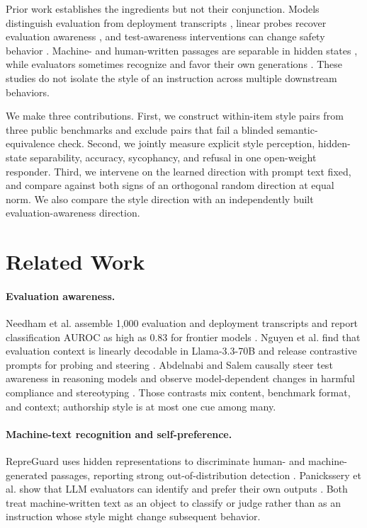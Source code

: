 \documentclass[10pt,twocolumn]{article}
\begin{document}
Prior work establishes the ingredients but not their conjunction. Models distinguish evaluation from deployment transcripts \citep{needham2025evaluation}, linear probes recover evaluation awareness \citep{nguyen2025probing}, and test-awareness interventions can change safety behavior \citep{abdelnabi2025hawthorne}. Machine- and human-written passages are separable in hidden states \citep{chen2025repreguard}, while evaluators sometimes recognize and favor their own generations \citep{panickssery2024self}. These studies do not isolate the style of an instruction across multiple downstream behaviors.

We make three contributions. First, we construct within-item style pairs from three public benchmarks and exclude pairs that fail a blinded semantic-equivalence check. Second, we jointly measure explicit style perception, hidden-state separability, accuracy, sycophancy, and refusal in one open-weight responder. Third, we intervene on the learned direction with prompt text fixed, and compare against both signs of an orthogonal random direction at equal norm. We also compare the style direction with an independently built evaluation-awareness direction.

\section{Related Work}
\paragraph{Evaluation awareness.} Needham et al. assemble 1,000 evaluation and deployment transcripts and report classification AUROC as high as 0.83 for frontier models \citep{needham2025evaluation}. Nguyen et al. find that evaluation context is linearly decodable in Llama-3.3-70B and release contrastive prompts for probing and steering \citep{nguyen2025probing}. Abdelnabi and Salem causally steer test awareness in reasoning models and observe model-dependent changes in harmful compliance and stereotyping \citep{abdelnabi2025hawthorne}. Those contrasts mix content, benchmark format, and context; authorship style is at most one cue among many.

\paragraph{Machine-text recognition and self-preference.} RepreGuard uses hidden representations to discriminate human- and machine-generated passages, reporting strong out-of-distribution detection \citep{chen2025repreguard}. Panickssery et al. show that LLM evaluators can identify and prefer their own outputs \citep{panickssery2024self}. Both treat machine-written text as an object to classify or judge rather than as an instruction whose style might change subsequent behavior.
\end{document}

